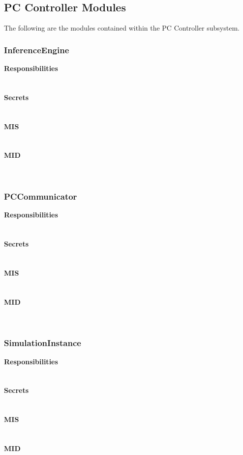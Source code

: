 \documentclass[titlepage]{article}
\begin{document}
\subsection{PC Controller Modules}
The following are the modules contained within the PC Controller subsystem.
\subsubsection{InferenceEngine}
\textbf{Responsibilities}\\
\\\\%
\textbf{Secrets}\\
\\\\%
\textbf{MIS}\\
\\\\%
\textbf{MID}\\
\\\\%
\subsubsection{PCCommunicator}
\textbf{Responsibilities}\\
\\\\%
\textbf{Secrets}\\
\\\\%
\textbf{MIS}\\
\\\\%
\textbf{MID}\\
\\\\%
\subsubsection{SimulationInstance}
\textbf{Responsibilities}\\
\\\\%
\textbf{Secrets}\\
\\\\%
\textbf{MIS}\\
\\\\%
\textbf{MID}\\
\\\\%
\end{document}

